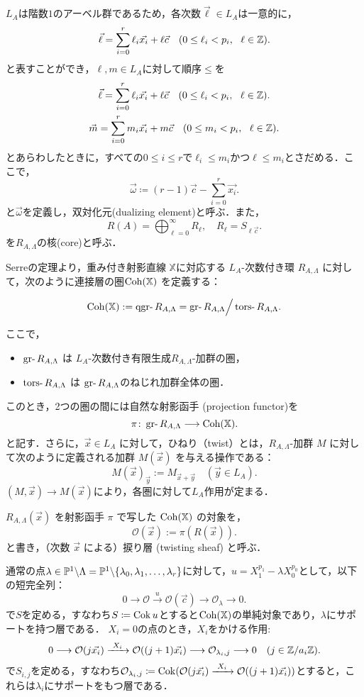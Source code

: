 $L_A$は階数$1$のアーベル群であるため，各次数$\vec{\ell}\in L_A$は一意的に，
\[\vec{\ell} = \sum_{i=0}^r \ell_i\vec{x_i} + \ell\vec{c}\quad (0\le \ell_i < p_i,\ \ \ell \in {\mathbb Z}).\]
と表すことができ，$\ell,m\in L_A$に対して順序$\le$を
\begin{gather*}
\vec{\ell} = \sum_{i=0}^r \ell_i\vec{x_i} + \ell\vec{c}\quad (0\le \ell_i < p_i,\ \ \ell \in \ZZ).\\
\vec{m} = \sum_{i=0}^r m_i\vec{x_i} + m\vec{c}\quad (0\le m_i < p_i,\ \ \ell \in \ZZ).
\end{gather*}
とあらわしたときに，すべての$0\le i\le r$で$\ell_i\le m_i$かつ$\ell\le m_i$とさだめる．ここで，
\[\vec{\omega} \coloneq (r-1)\vec{c} - \sum_{i=0}^r\vec{x_i}.\]
と$\vec{\omega}$を定義し，双対化元(dualizing element)と呼ぶ．また，
\[R(A)= \bigoplus_{\ell=0}^\infty R_{\ell},\quad R_\ell = S_{\ell\vec{c}}.\]
を$R_{A,\Lambda}$の核(core)と呼ぶ．

\begin{defn}\cite{GL87}
	Serreの定理より，重み付き射影直線 $\mathbb{X}$に対応する $L_A$-次数付き環 $R_{A,\Lambda}$ に対して，次のように連接層の圏$\operatorname{\mathrm{Coh}}(\mathbb{X})$ を定義する：

\[
\Coh(\mathbb{X}) := \qgr R_{A,\Lambda} = \gr R_{A,\Lambda}\Big{/}\tors R_{A,\Lambda}.
\]

ここで，
\begin{itemize}
	\item $\gr R_{A,\Lambda}$ は $L_A$-次数付き有限生成$R_{A,\Lambda}$-加群の圏，
	\item $\tors R_{A,\Lambda}$ は $\gr R_{A,\Lambda}$のねじれ加群全体の圏．
\end{itemize}
このとき，2つの圏の間には自然な射影函手 (projection functor)を
\[ \pi\colon \gr R_{A,\Lambda} \longrightarrow \Coh(\XX) .\]
と記す．さらに，$\vec{x} \in L_A$ に対して，ひねり（twist）とは，$R_{A,\Lambda}$-加群 $M$ に対して次のように定義される加群 $M(\vec{x})$ を与える操作である：
\[
M(\vec{x})_{\vec{y}} := M_{\vec{x} + \vec{y}} \quad (\vec{y} \in L_A).
\]
$(M,\vec{x})\to M(\vec{x})$により，各圏に対して$L_A$作用が定まる．
\end{defn}
$R_{A,\Lambda}(\vec{x})$ を射影函手 $\pi$ で写した $\operatorname{\mathrm{Coh}}({\mathbb X})$ の対象を，
\[ \mathcal{O}(\vec{x}) := \pi(R(\vec{x})). \]
と書き，（次数 $\vec{x}$ による）捩り層 (twisting sheaf) と呼ぶ．

通常の点$\lambda\in{\mathbb P}^1\backslash\Lambda = {\mathbb P}^1\backslash\{\lambda_0,\lambda_1,\ldots, \lambda_r\}$に対して，$u = X_1^{p_1} - \lambda X_0^{p_0}$として，以下の短完全列：
\[0\longrightarrow \mathcal{O}\xrightarrow{\ u\ }\mathcal{O}(\vec{c})\longrightarrow \mathcal{O}_{\lambda}\longrightarrow 0.\]
で$S$を定める，すなわち$S\coloneq \operatorname{Cok} u $とすると$\operatorname{\mathrm{Coh}}({\mathbb X})$の単純対象であり，$\lambda$にサポートを持つ層である．
$X_i=0$の点のとき，$X_i$をかける作用:
\[0\longrightarrow \mathcal{O}(j\vec{x_i})\xrightarrow{\ X_i\ }\mathcal{O}((j+1)\vec{x_i})\longrightarrow \mathcal{O}_{\lambda_i,j}\longrightarrow 0\quad (j\in \ZZ/a_i\ZZ).\]
で$S_{i,j}$を定める，すなわち$\mathcal{O}_{\lambda_i,j}\coloneq \Cok (\mathcal{O}(j\vec{x_i})\xrightarrow{\ X_i\ }\mathcal{O}((j+1)\vec{x_i}))$とすると，これらは$\lambda_i$にサポートをもつ層である．


